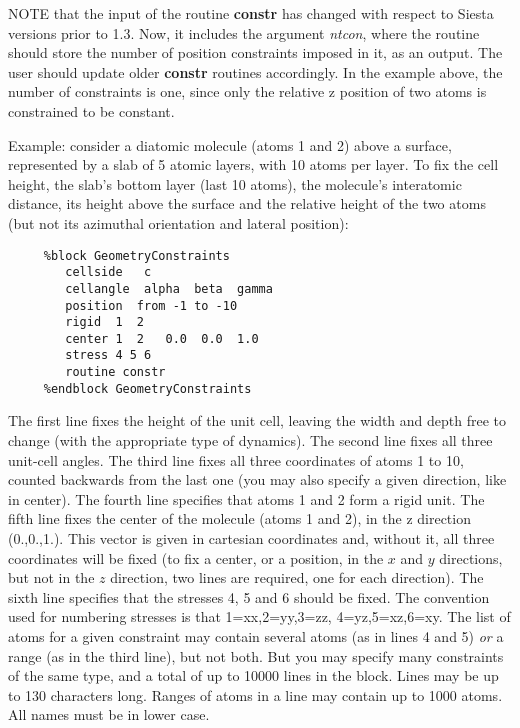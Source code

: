 \documentclass[11pt]{article}
\begin{document}
\begin{description}
\begin{itemize}
NOTE that the input of the routine {\bf constr} has changed
with respect to {\sc Siesta} versions prior to 1.3. Now, it includes the
argument {\it ntcon}, where the routine should
store the number of position constraints imposed in it,
as an output.  The user should update older {\bf constr} routines
accordingly. In the example above, the number of constraints is one,
since only the relative z position of two atoms is constrained
to be constant.

\end{itemize}

Example: consider a diatomic molecule (atoms 1 and 2) above a surface, 
represented by a slab of 5 atomic layers, with 10 atoms per layer.
To fix the cell height, the slab's bottom layer (last 10 atoms),
the molecule's interatomic distance, its height above the surface and
the relative height of the two atoms
(but not its azimuthal orientation and lateral position):

\begin{verbatim}
     %block GeometryConstraints
        cellside   c 
        cellangle  alpha  beta  gamma
        position  from -1 to -10
        rigid  1  2
        center 1  2   0.0  0.0  1.0
        stress 4 5 6
        routine constr
     %endblock GeometryConstraints
\end{verbatim}

The first line fixes the height of the unit cell, leaving the width
and depth free to change (with the appropriate type of dynamics).  The
second line fixes all three unit-cell angles.  The third line fixes
all three coordinates of atoms 1 to 10, counted backwards from the
last one (you may also specify a given direction, like in center).
The fourth line specifies that atoms 1 and 2 form a rigid unit.  The
fifth line fixes the center of the molecule (atoms 1 and 2), in the z
direction (0.,0.,1.). This vector is given in cartesian coordinates
and, without it, all three coordinates will be fixed (to fix a center,
or a position, in the $x$ and $y$ directions, but not in the $z$
direction, two lines are required, one for each direction).  The sixth
line specifies that the stresses 4, 5 and 6 should be fixed.  The
convention used for numbering stresses is that 1=xx,2=yy,3=zz,
4=yz,5=xz,6=xy.  The list of atoms for a given constraint may contain
several atoms (as in lines 4 and 5) {\it or} a range (as in the third
line), but not both. But you may specify many constraints of the same
type, and a total of up to 10000 lines in the block.  Lines may be up
to 130 characters long. Ranges of atoms in a line may contain up to
1000 atoms. All names must be in lower case.


\end{description}
\end{document}
